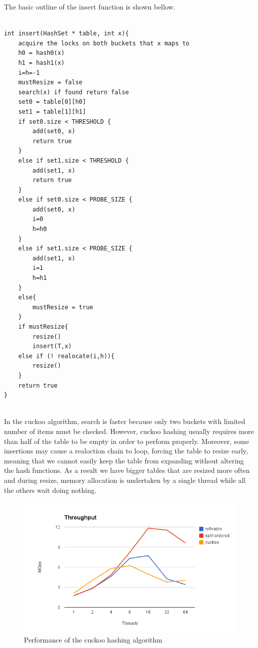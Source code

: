 The basic outline of the insert function is shown bellow.

\begin{lstlisting}

int insert(HashSet * table, int x){
	acquire the locks on both buckets that x maps to
	h0 = hash0(x)
	h1 = hash1(x)
	i=h=-1
	mustResize = false
	search(x) if found return false
	set0 = table[0][h0]
	set1 = table[1][h1]
	if set0.size < THRESHOLD {
		add(set0, x)
		return true
	}
	else if set1.size < THRESHOLD {
		add(set1, x)
		return true
	}
	else if set0.size < PROBE_SIZE {
		add(set0, x)
		i=0 
		h=h0
	}
	else if set1.size < PROBE_SIZE {
		add(set1, x)
		i=1
		h=h1
	}
	else{
		mustResize = true
	}
	if mustResize{
		resize()	
		insert(T,x)
	else if (! realocate(i,h)){
		resize()
	}
	return true
}
		

\end{lstlisting}


In the cuckoo algorithm, search is faster because only two buckets with limited number of items must be checked. However, cuckoo hashing usually requires more than half of the table to be empty in order to perform properly. Moreover, some insertions may cause a realoction chain to loop, forcing the table to resize early, meaning that we cannot easily keep the table from expanding without altering the hash functions. As a result we have bigger tables that are resized more often and during resize, memory allocation is undertaken by a single thread while all the others wait doing nothing.

\begin{figure}
 \centering
  \includegraphics[scale=0.5]{hashes_cuckoo_perf.png}
\caption{Performance of the cuckoo hashing algorithm}
\label{hashes_cuckoo_perf}
\end{figure}

